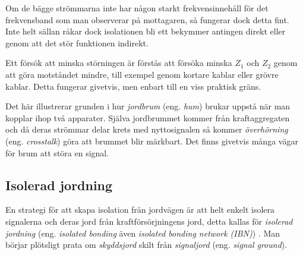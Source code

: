 Om de bägge strömmarna inte har någon starkt frekvensinnehåll för det
frekvensband som man observerar på mottagaren, så fungerar dock detta fint.
Inte helt sällan råkar dock isolationen bli ett bekymmer antingen direkt eller
genom att det stör funktionen indirekt.

Ett försök att minska störningen är förstås att försöka minska \(Z_1\) och
\(Z_2\) genom att göra motståndet mindre, till exempel genom kortare kablar eller
grövre kablar.
Detta fungerar givetvis, men enbart till en viss praktisk gräns.

Det här illustrerar grunden i hur \emph{jordbrum} (eng. \emph{hum}) brukar
uppstå när man kopplar ihop två apparater.
Själva jordbrummet kommer från kraftaggregaten och då deras strömmar delar
krets med nyttosignalen så kommer \emph{överhörning} (eng. \emph{crosstalk})
göra att brummet blir märkbart.
Det finns givetvis många vägar för brum att störa en signal.

\subsection{Isolerad jordning}

En strategi för att skapa isolation från jordvägen är att helt enkelt
isolera signalerna och deras jord från kraftförsörjningens jord, detta kallas
för \emph{isolerad jordning} (eng. \emph{isolated bonding} även \emph{isolated
 bonding network (IBN)}) \cite[kap 3.2.4]{K27-1991}.
Man börjar plötsligt prata om \emph{skyddsjord} skilt från \emph{signaljord}
(eng. \emph{signal ground}).


